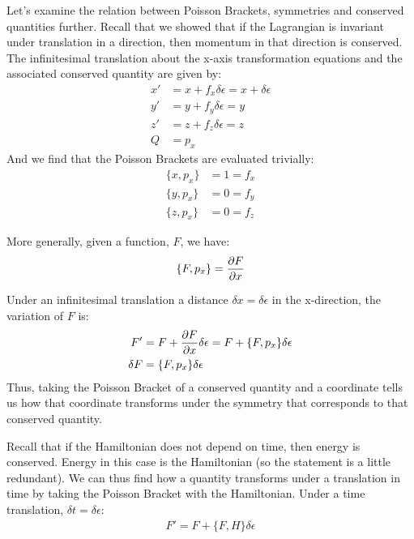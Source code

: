 Let's examine the relation between Poisson Brackets, symmetries and conserved quantities further. Recall that we showed that if the Lagrangian is invariant under translation in a direction, then momentum in that direction is conserved. The infinitesimal translation about the x-axis transformation equations and the associated conserved quantity are given by:
\begin{align}
x'&=x+f_x\delta\epsilon =x+\delta\epsilon\nonumber\\
y'&=y+f_y\delta\epsilon =y\nonumber\\
z'&=z+f_z\delta\epsilon =z\nonumber\\
Q &=p_x
\end{align}
And we find that the Poisson Brackets are evaluated trivially:
\begin{align}
\{x,p_x\}&=1=f_x\nonumber\\
\{y,p_x\}&=0=f_y\nonumber\\
\{z,p_x\}&=0=f_z
\end{align}

More generally, given a function, $F$, we have:
\begin{align}
\{F,p_x\}=\frac{\partial F}{\partial x}
\end{align}

Under an infinitesimal translation a distance $\delta x=\delta\epsilon$ in the x-direction, the variation of $F$ is:
\begin{align}
F'&=F+\frac{\partial F}{\partial x}\delta\epsilon =F+\{F,p_x\}\delta\epsilon\nonumber\\
\delta F&=\{F,p_x\}\delta\epsilon
\end{align}
Thus, taking the Poisson Bracket of a conserved quantity and a coordinate tells us how that coordinate transforms under the symmetry that corresponds to that conserved quantity.

Recall that if the Hamiltonian does not depend on time, then energy is conserved. Energy in this case is the Hamiltonian (so the statement is a little redundant). We can thus find how a quantity transforms under a translation in time by taking the Poisson Bracket with the Hamiltonian. Under a time translation, $\delta t = \delta \epsilon$:
\begin{align}
F'=F+\{F,H\}\delta\epsilon
\end{align}

